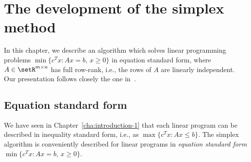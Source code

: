 \chapter{The development of the simplex method}
\label{cha:introduction}



In this chapter, we describe an algorithm which solves linear
programming problems $\min\{c^Tx \colon Ax = b, \, x\geq0\}$ in
equation standard form, where $A \in \setR^{m\times n}$ has full row-rank, i.e.,
the rows of $A$ are linearly independent. Our presentation follows
closely the one in~\cite{BertsimasTsitsiklis97}. 




\section{Equation standard form}
\label{sec:equat-stand-form}

We have seen in Chapter~\ref{cha:introduction-1} that each linear
program can be described in inequality standard form, i.e., as
$\max\{c^Tx \colon Ax\leq b\}$. The simplex algorithm is conveniently
described for linear programs in \emph{equation standard form} $\min\{c^Tx \colon
Ax = b, \, x\geq0\}$.  

